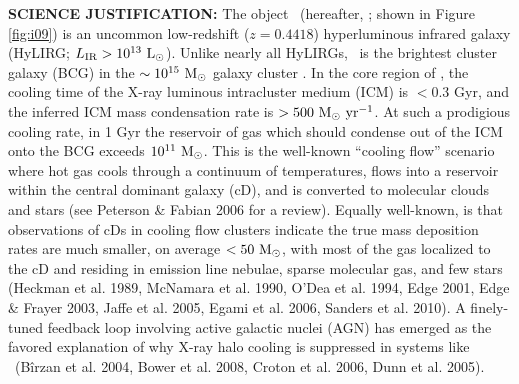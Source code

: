 \documentclass[11pt]{article}
\begin{document}


{\bf{SCIENCE JUSTIFICATION:}} The object \iras\ (hereafter, \irs;
shown in Figure \ref{fig:i09}) is an uncommon low-redshift ($z =
0.4418$) hyperluminous infrared galaxy (HyLIRG; $L_{\mathrm{IR}} >
10^{13} ~\mathrm{L}_{\odot}$). Unlike nearly all HyLIRGs, \irs\ is the brightest
cluster galaxy (BCG) in the $\sim 10^{15} ~\mathrm{M}_{\odot}$ galaxy cluster
\rxj. In the core region of \rxj, the cooling time of the X-ray
luminous intracluster medium (ICM) is $< 0.3$ Gyr, and the inferred
ICM mass condensation rate is $> 500 ~\mathrm{M}_{\odot}~\mathrm{yr}^{-1}$. At such a prodigious
cooling rate, in 1 Gyr the reservoir of gas which should condense out
of the ICM onto the BCG exceeds $10^{11} ~\mathrm{M}_{\odot}$. This is the
well-known ``cooling flow'' scenario where hot gas cools through a
continuum of temperatures, flows into a reservoir within the central
dominant galaxy (cD), and is converted to molecular clouds and stars
(see Peterson \& Fabian 2006 for a review). Equally well-known, is
that observations of cDs in cooling flow clusters indicate the true
mass deposition rates are much smaller, on average $< 50 ~\mathrm{M}_{\odot}$, with
most of the gas localized to the cD and residing in emission line
nebulae, sparse molecular gas, and few stars (Heckman et al. 1989,
McNamara et al. 1990, O'Dea et al. 1994, Edge 2001, Edge \& Frayer
2003, Jaffe et al. 2005, Egami et al. 2006, Sanders et al. 2010). A
finely-tuned feedback loop involving active galactic nuclei (AGN) has
emerged as the favored explanation of why X-ray halo cooling is
suppressed in systems like \irs\ (B\^irzan et al. 2004, Bower et
al. 2008, Croton et al. 2006, Dunn et al. 2005).
\end{document}

